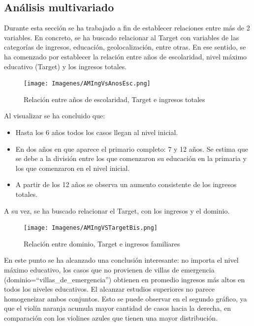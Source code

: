 \documentclass[a4paper]{article}
\begin{document}
    \newpage
    
    \subsection{Análisis multivariado}
 
        Durante esta sección se ha trabajado a fin de establecer relaciones entre más de 2 variables. En concreto, se ha buscado relacionar al Target con variables de las categorías de ingresos, educación, geolocalización, entre otras.
        En ese sentido, se ha comenzado por establecer la relación entre años de escolaridad, nivel máximo educativo (Target) y los ingresos totales.
 
        \begin{figure}[H]
            \centering
            \texttt{[image: Imagenes/AMIngVsAnosEsc.png]}
            \caption{Relación entre años de escolaridad, Target e ingresos totales}
            \label{AM Scholar Years, Taget and Total Income}
        \end{figure}
 
        Al visualizar se ha concluido que:
 
        \begin{itemize}
            \item Hasta los 6 años todos los casos llegan al nivel inicial.
            \item En dos años en que aparece el primario completo: 7 y 12 años. Se estima que se debe a la división entre los que comenzaron su educación en la primaria y los que comenzaron en el nivel inicial.
            \item A partir de los 12 años se observa un aumento consistente de los ingresos totales.
        \end{itemize}
        \vspace{1cm}

        A su vez, se ha buscado relacionar el Target, con los ingresos y el dominio.
 
        \begin{figure}[H]
            \centering
            \texttt{[image: Imagenes/AMIngVSTargetBis.png]}
            \caption{Relación entre dominio, Target e ingresos familiares}
            \label{AM Dominio, Taget and Familiar Income}
        \end{figure}

 
        En este punto se ha alcanzado una conclusión interesante: no importa el nivel máximo educativo, los casos que no provienen de villas de emergencia (dominio=``villas\_de\_emergencia'') obtienen en promedio ingresos más altos en todos los niveles educativos. El alcanzar estudios superiores no parece homogeneizar ambos conjuntos. Esto se puede observar en el segundo gráfico, ya que el violín naranja acumula mayor cantidad de casos hacia la derecha, en comparación con los violines azules que tienen una mayor distribución.
        
\end{document}
